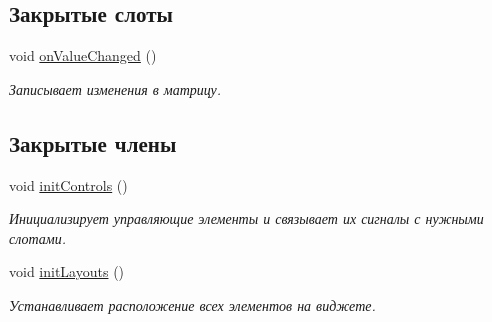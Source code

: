 \subsection*{Закрытые слоты}
\begin{DoxyCompactItemize}
\item 
\hypertarget{class_matrix_widget_a0d0d61d1a4cf286f90026d1dfa690121}{}\label{class_matrix_widget_a0d0d61d1a4cf286f90026d1dfa690121} 
void \hyperlink{class_matrix_widget_a0d0d61d1a4cf286f90026d1dfa690121}{on\+Value\+Changed} ()
\begin{DoxyCompactList}\small\item\em Записывает изменения в матрицу. \end{DoxyCompactList}\end{DoxyCompactItemize}
\subsection*{Закрытые члены}
\begin{DoxyCompactItemize}
\item 
\hypertarget{class_matrix_widget_a9c693e71b54ca95204792160dfe1c4bf}{}\label{class_matrix_widget_a9c693e71b54ca95204792160dfe1c4bf} 
void \hyperlink{class_matrix_widget_a9c693e71b54ca95204792160dfe1c4bf}{init\+Controls} ()
\begin{DoxyCompactList}\small\item\em Инициализирует управляющие элементы и связывает их сигналы с нужными слотами. \end{DoxyCompactList}\item 
\hypertarget{class_matrix_widget_ae3c951130052ad2d93105a98c4468b13}{}\label{class_matrix_widget_ae3c951130052ad2d93105a98c4468b13} 
void \hyperlink{class_matrix_widget_ae3c951130052ad2d93105a98c4468b13}{init\+Layouts} ()
\begin{DoxyCompactList}\small\item\em Устанавливает расположение всех элементов на виджете. \end{DoxyCompactList}\end{DoxyCompactItemize}
